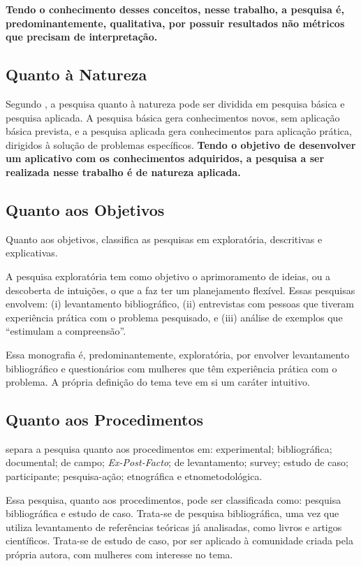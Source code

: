 \textbf{Tendo o conhecimento desses conceitos, nesse trabalho, a pesquisa é, 
predominantemente, qualitativa, por possuir resultados não métricos que precisam de 
interpretação.} 


\subsection{Quanto à Natureza}

Segundo , a pesquisa quanto à natureza pode ser dividida em pesquisa 
básica e pesquisa aplicada. A pesquisa básica gera conhecimentos novos, sem aplicação básica 
prevista, e a pesquisa aplicada gera conhecimentos para aplicação prática, dirigidos à solução de 
problemas específicos.\textbf{ Tendo o objetivo de desenvolver um aplicativo com os conhecimentos 
adquiridos, a pesquisa a ser realizada nesse trabalho é de natureza aplicada.}

 
\subsection{Quanto aos Objetivos}

Quanto aos objetivos,  classifica as pesquisas em exploratória, 
descritivas e explicativas. 

A pesquisa exploratória tem como objetivo o aprimoramento 
de ideias, ou a descoberta de intuições, o que a faz ter um planejamento flexível. 
Essas pesquisas envolvem: (i) levantamento bibliográfico, (ii) entrevistas com pessoas 
que tiveram experiência prática com o problema pesquisado, e (iii) análise de exemplos que 
``estimulam a compreensão''.

Essa monografia é, predominantemente, exploratória, 
por envolver levantamento bibliográfico e questionários com mulheres que têm experiência 
prática com o problema. A própria definição do tema teve em si um caráter intuitivo. 

\subsection{Quanto aos Procedimentos}

 separa a pesquisa quanto aos 
procedimentos em: experimental; bibliográfica; 
documental; de campo; \emph{Ex-Post-Facto}; 
de levantamento; survey; estudo de caso; 
participante; pesquisa-ação; etnográfica e etnometodológica.

Essa pesquisa, quanto aos procedimentos, pode ser classificada como: pesquisa bibliográfica e 
estudo de caso. Trata-se de pesquisa bibliográfica, uma vez que utiliza levantamento de 
referências teóricas já analisadas, como livros e artigos científicos. Trata-se de estudo de 
caso, por ser aplicado à comunidade criada pela própria autora, com mulheres com interesse no 
tema.


